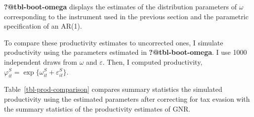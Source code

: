 \documentclass[
  12pt]{article}
\theoremstyle{definition}
\theoremstyle{remark}
\begin{document}
\textbf{?@tbl-boot-omega} displays the estimates of the distribution
parameters of \(\omega\) corresponding to the instrument used in the
previous section and the parametric specification of an AR(1).

\begin{table}

\caption{\label{tbl-omega}Estimates Omega Distribution by Industry after
Deconvoluting from the Output Shock.}


\end{table}%

To compare these productivity estimates to uncorrected ones, I simulate
productivity using the parameters estimated in
\textbf{?@tbl-boot-omega}. I use 1000 independent draws from \(\omega\)
and \(\varepsilon\). Then, I computed productivity,
\(\varphi_{it}^S=\exp\{\omega_{it}^S+\varepsilon_{it}^S\}\).

Table~\ref{tbl-prod-comparison} compares summary statistics the
simulated productivity using the estimated parameters after correcting
for tax evasion with the summary statistics of the productivity
estimates of GNR.
\end{document}
